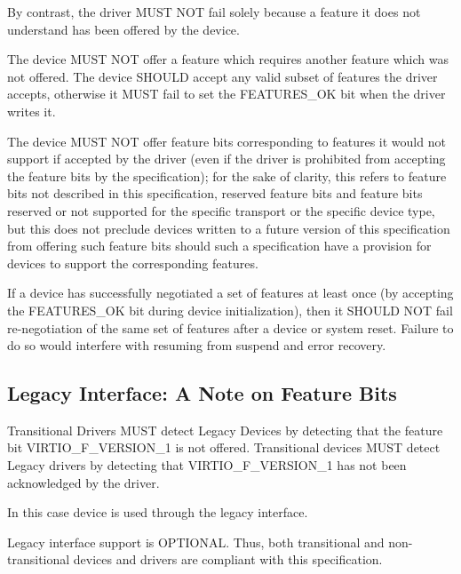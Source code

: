 By contrast, the driver MUST NOT fail solely because a feature
it does not understand has been offered by the device.

The device MUST NOT offer a feature which requires another feature
which was not offered.  The device SHOULD accept any valid subset
of features the driver accepts, otherwise it MUST fail to set the
FEATURES_OK  bit when the driver writes it.

The device MUST NOT offer feature bits corresponding to features
it would not support if accepted by the driver (even if the
driver is prohibited from accepting the feature bits by the
specification); for the sake of clarity, this refers to feature
bits not described in this specification, reserved feature bits
and feature bits reserved or not supported for the specific
transport or the specific device type, but this does not preclude
devices written to a future version of this specification from
offering such feature bits should such a specification have a
provision for devices to support the corresponding features.

If a device has successfully negotiated a set of features
at least once (by accepting the FEATURES_OK  bit during device initialization), then it SHOULD
NOT fail re-negotiation of the same set of features after
a device or system reset.  Failure to do so would interfere
with resuming from suspend and error recovery.

\subsection{Legacy Interface: A Note on Feature
Bits}\label{sec:Basic Facilities of a Virtio Device / Feature
Bits / Legacy Interface: A Note on Feature Bits}

Transitional Drivers MUST detect Legacy Devices by detecting that
the feature bit VIRTIO_F_VERSION_1 is not offered.
Transitional devices MUST detect Legacy drivers by detecting that
VIRTIO_F_VERSION_1 has not been acknowledged by the driver.

In this case device is used through the legacy interface.

Legacy interface support is OPTIONAL.
Thus, both transitional and non-transitional devices and
drivers are compliant with this specification.

